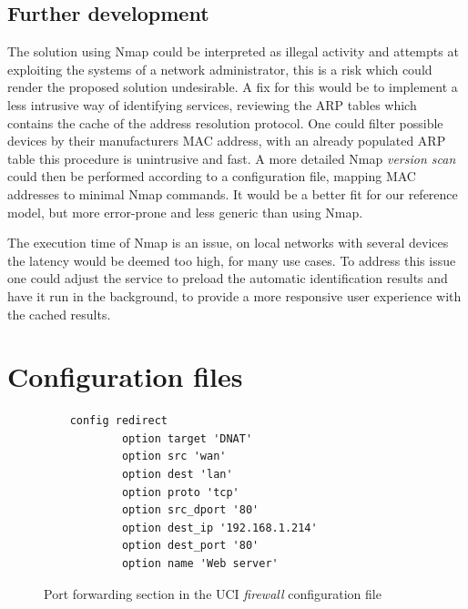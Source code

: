 \documentclass[a4paper,11pt,makeidx]{kth-bcs}
\begin{document}
\newpage
\section{Further development}
The solution using Nmap could be interpreted as illegal activity and attempts at exploiting the systems of a network administrator, this is a risk which could render the proposed solution undesirable.
A fix for this would be to implement a less intrusive way of identifying services, reviewing the ARP tables which contains the cache of the address resolution protocol.
One could filter possible devices by their manufacturers MAC address, with an already populated ARP table this procedure is unintrusive and fast.
A more detailed Nmap \emph{version scan} could then be performed according to a configuration file, mapping MAC addresses to minimal Nmap commands.
It would be a better fit for our reference model, but more error-prone and less generic than using Nmap.

The execution time of Nmap is an issue, on local networks with several devices the latency would be deemed too high, for many use cases.
To address this issue one could adjust the service to preload the automatic identification results and have it run in the background, to provide a more responsive user experience with the cached results.

\newpage
\newpage
\appendix
\addappheadtotoc
\chapter{Configuration files}\label{appA}

   \begin{figure}[ht]
      \centering
      \begin{lstlisting}
    config redirect               
            option target 'DNAT' 
            option src 'wan'
            option dest 'lan'
            option proto 'tcp'
            option src_dport '80'
            option dest_ip '192.168.1.214'
            option dest_port '80' 
            option name 'Web server'
      \end{lstlisting}
      \caption{
         \small{
Port forwarding section in the UCI \emph{firewall} configuration file
         }
      }
      \label{fig:redirect_conf}
   \end{figure}
\end{document}
